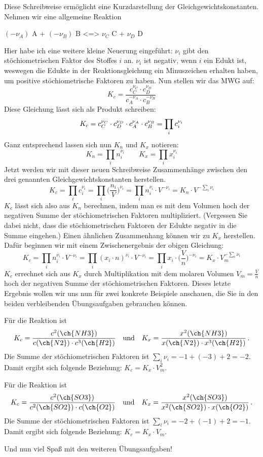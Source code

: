 \documentclass[DIV11]{scrartcl}
\begin{document}
\begin{intermission}
  Diese Schreibweise ermöglicht eine Kurzdarstellung der
  Gleichgewichtskonstanten.  Nehmen wir eine allgemeine Reaktion
  \begin{reaction*}
    $(-\nu_A)$ A + $(-\nu_B)$ B <=> $\nu_C$ C + $\nu_D$ D
  \end{reaction*}
  Hier habe ich eine weitere kleine Neuerung eingeführt: $\nu_i$ gibt den
  stöchiometrischen Faktor des Stoffes $i$ an.  $\nu_i$ ist negativ, wenn $i$
  ein Edukt ist, weswegen die Edukte in der Reaktionsgleichung ein
  Minuszeichen erhalten haben, um positive stöchiometrische Faktoren zu haben.
  Nun stellen wir das MWG auf:
  \[
    K_c = \frac
            { c_C^{\nu_C} \cdot c_D^{\nu_D} }
            { c_A^{-\nu_A } \cdot c_B^{-\nu_B} }
  \]
  Diese Gleichung lässt sich als Produkt schreiben:
  \[
    K_c =  c_C^{\nu_C} \cdot c_D^{\nu_D} \cdot c_A^{\nu_A } \cdot c_B^{\nu_B} \\
        = \prod_i c_i^{\nu_i}
  \]
  Ganz entsprechend lassen sich nun $K_n$ und $K_x$ notieren:
  \[
    K_n = \prod_i n_i^{\nu_i} \qquad
    K_x = \prod_i x_i^{\nu_i}
  \]
  Jetzt werden wir mit dieser neuen Schreibweise Zusammenhänge zwischen den
  drei genannten Gleichgewichtskonstanten herstellen.
  \[
    K_c = \prod_i c_i^{\nu_i}
        = \prod_i \biggl(\frac{n_i}{V}\biggr)^{\nu_i}
        = \prod_i n_i^{\nu_i} \cdot V^{-\nu_i}
        = K_n \cdot V^{-\sum_i\nu_i}
  \]
  $K_c$ lässt sich also aus $K_n$ berechnen, indem man es mit dem Volumen hoch
  der negativen Summe der stöchiometrischen Faktoren multipliziert.
  (Vergessen Sie dabei nicht, dass die stöchiometrischen Faktoren der Edukte
  negativ in die Summe eingehen.)  Einen ähnlichen Zusammenhang können wir zu
  $K_x$ herstellen.  Dafür beginnen wir mit einem Zwischenergebnis der obigen
  Gleichung:
  \[
    K_c = \prod_i n_i^{\nu_i} \cdot V^{-\nu_i}
        = \prod_i (x_i\cdot n)^{\nu_i} \cdot V^{-\nu_i}
        = \prod_i x_i \cdot \biggl(\frac{V}{n}\biggr)^{-\nu_i}
        = K_x \cdot V_m^{-\sum_i\nu_i}
  \]
  $K_c$ errechnet sich aus $K_x$ durch Multiplikation mit dem molaren Volumen
  $V_m = \frac{V}{n}$ hoch der negativen Summe der stöchiometrischen Faktoren.
  Dieses letzte Ergebnis wollen wir uns nun für zwei konkrete Beispiele
  anschauen, die Sie in den beiden verbleibenden Übungsaufgaben gebrauchen
  können.

  Für die Reaktion  ist
  \[
    K_c = \frac{ c^2(\ch{NH3}) }{ c(\ch{N2}) \cdot c^3(\ch{H2}) }
    \quad \text{und} \quad
    K_x = \frac{ x^2(\ch{NH3}) }{ x(\ch{N2}) \cdot x^3(\ch{H2}) } \,.
  \]
  Die Summe der stöchiometrischen Faktoren ist $\sum_i\nu_i = -1 + (-3) +2 =
  -2$. Damit ergibt sich folgende Beziehung: $K_c=K_x\cdot V_m^2$.

  Für die Reaktion  ist
  \[
    K_c = \frac{ c^2(\ch{SO3}) }{ c^2(\ch{SO2}) \cdot c(\ch{O2}) }
    \quad \text{und} \quad
    K_x = \frac{ x^2(\ch{SO3}) }{ x^2(\ch{SO2}) \cdot x(\ch{O2}) } \,.
  \]
  Die Summe der stöchiometrischen Faktoren ist $\sum_i\nu_i = -2 + (-1) +2 =
  -1$. Damit ergibt sich folgende Beziehung: $K_c=K_x\cdot V_m$.

  Und nun viel Spaß mit den weiteren Übungsaufgaben!
\end{intermission}
\end{document}
